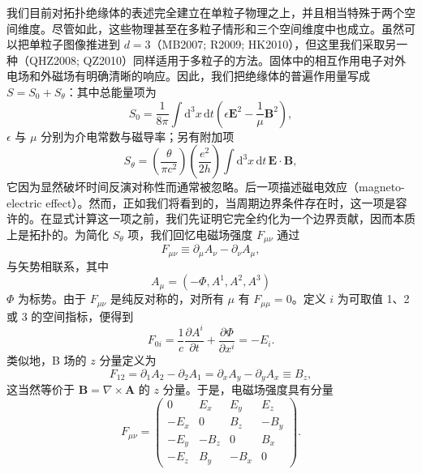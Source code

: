 我们目前对拓扑绝缘体的表述完全建立在单粒子物理之上，并且相当特殊于两个空间维度。尽管如此，这些物理甚至在多粒子情形和三个空间维度中也成立。虽然可以把单粒子图像推进到 $d=3$（MB2007; R2009; HK2010），但这里我们采取另一种（QHZ2008; QZ2010）同样适用于多粒子的方法。固体中的相互作用电子对外电场和外磁场有明确清晰的响应。因此，我们把绝缘体的普遍作用量写成 $S=S_{0}+S_{\theta}$：其中总能量项为
\begin{equation*}
S_{0}=\frac{1}{8\pi}\int\mathrm{d}^{3}x\,\mathrm{d}t\left(\epsilon\mathbf{E}^{2}-\frac{1}{\mu}\mathbf{B}^{2}\right),\tag{15.58}
\end{equation*}
$\epsilon$ 与 $\mu$ 分别为介电常数与磁导率；另有附加项
\begin{equation*}
S_{\theta}=\left(\frac{\theta}{\pi c^{2}}\right)\left(\frac{e^{2}}{2h}\right)\int\mathrm{d}^{3}x\,\mathrm{d}t\,\mathbf{E}\cdot\mathbf{B},\tag{15.59}
\end{equation*}
它因为显然破坏时间反演对称性而通常被忽略。后一项描述磁电效应（magneto-electric effect）。然而，正如我们将看到的，当周期边界条件存在时，这一项是容许的。在显式计算这一项之前，我们先证明它完全约化为一个边界贡献，因而本质上是拓扑的。为简化 $S_{\theta}$ 项，我们回忆电磁场强度 $F_{\mu\nu}$ 通过
\begin{equation*}
F_{\mu\nu}\equiv\partial_{\mu}A_{\nu}-\partial_{\nu}A_{\mu},\tag{15.60}
\end{equation*}
与矢势相联系，其中
\begin{equation*}
A_{\mu}=(-\Phi,A^{1},A^{2},A^{3})\tag{15.61}
\end{equation*}
$\Phi$ 为标势。由于 $F_{\mu\nu}$ 是纯反对称的，对所有 $\mu$ 有 $F_{\mu\mu}=0$。定义 $i$ 为可取值 1、2 或 3 的空间指标，便得到
\begin{equation*}
F_{0i}=\frac{1}{c}\frac{\partial A^{i}}{\partial t}+\frac{\partial\Phi}{\partial x^{i}}=-E_{i}.\tag{15.62}
\end{equation*}
类似地，B 场的 $z$ 分量定义为
\begin{equation*}
F_{12}=\partial_{1}A_{2}-\partial_{2}A_{1}=\partial_{x}A_{y}-\partial_{y}A_{x}\equiv B_{z},\tag{15.63}
\end{equation*}
这当然等价于 $\mathbf{B}=\nabla\times\mathbf{A}$ 的 $z$ 分量。于是，电磁场强度具有分量
\begin{equation*}
F_{\mu\nu}=\left(\begin{array}{cccc}
0 & E_{x} & E_{y} & E_{z}\\
-E_{x} & 0 & B_{z} & -B_{y}\\
-E_{y} & -B_{z} & 0 & B_{x}\\
-E_{z} & B_{y} & -B_{x} & 0
\end{array}\right).\tag{15.64}
\end{equation*}
